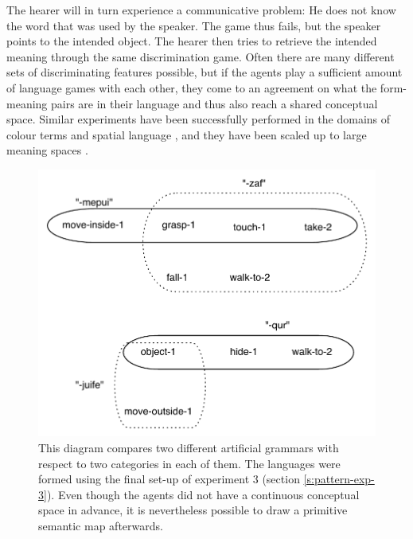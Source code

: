 The hearer will in turn experience a communicative problem: He does not know the word that was used by the speaker. The game thus fails, but the speaker points to the intended object. The hearer then tries to retrieve the intended meaning through the same discrimination game. Often there are many different sets of discriminating features possible, but if the agents play a sufficient amount of language games with each other, they come to an agreement on what the form-meaning pairs are in their language and thus also reach a shared conceptual space. Similar experiments have been successfully performed in the domains of colour terms \citep{steels05coordinating} and spatial language \citep{steels08perspective-alignment}, and they have been scaled up to large meaning spaces \citep{wellens08coping}.
\begin{figure}[t]
\centerline{\includegraphics[scale=0.7]{Chapter5/figs/sem-map1}}
  \caption[Two `semantic maps' from the experiments]{This diagram compares two different artificial grammars with respect to two categories in each of them. The languages were formed using the final set-up of experiment 3 (section \ref{s:pattern-exp-3}). Even though the agents did not have a continuous conceptual space in advance, it is nevertheless possible to draw a primitive semantic map afterwards.}
   \label{f:semmap-1}
\end{figure}


